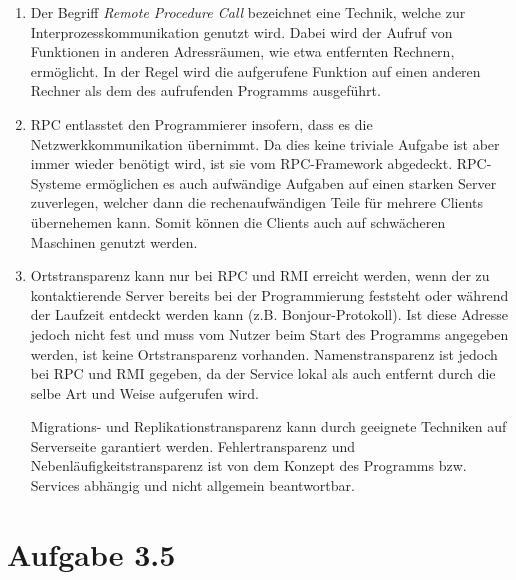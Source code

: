 \documentclass[german,12pt,a4paper]{article}
\begin{document}
\begin{enumerate}

	\item Der Begriff \textit{Remote Procedure Call} bezeichnet eine Technik, welche zur Interprozesskommunikation genutzt wird. 
	Dabei wird der Aufruf von Funktionen in anderen Adressräumen, wie etwa entfernten Rechnern, ermöglicht. In der Regel wird die 
	aufgerufene Funktion auf einen anderen Rechner als dem des aufrufenden Programms ausgeführt.
	 
	\item RPC entlasstet den Programmierer insofern, dass es die Netzwerkkommunikation übernimmt. Da
		dies keine triviale Aufgabe ist aber immer wieder benötigt wird, ist sie vom RPC-Framework
		abgedeckt. RPC-Systeme ermöglichen es auch aufwändige Aufgaben auf einen starken Server
		zuverlegen, welcher dann die rechenaufwändigen Teile für mehrere Clients übernehemen kann. Somit
		können die Clients auch auf schwächeren Maschinen genutzt werden.

	\item Ortstransparenz kann nur bei RPC und RMI erreicht werden, wenn der zu kontaktierende Server
		bereits bei der Programmierung feststeht oder während der Laufzeit entdeckt werden kann (z.B.
		Bonjour-Protokoll). Ist diese Adresse jedoch nicht fest und muss vom Nutzer beim Start des
		Programms angegeben werden, ist keine Ortstransparenz vorhanden. Namenstransparenz ist jedoch
		bei RPC und RMI gegeben, da der Service lokal als auch entfernt durch die selbe Art und Weise
		aufgerufen wird.

		Migrations- und Replikationstransparenz kann durch geeignete Techniken auf Serverseite garantiert
		werden. Fehlertransparenz und Nebenläufigkeitstransparenz ist von dem Konzept des Programms bzw.
		Services abhängig und nicht allgemein beantwortbar.
	
\end{enumerate}

\section*{Aufgabe 3.5}
\end{document}
